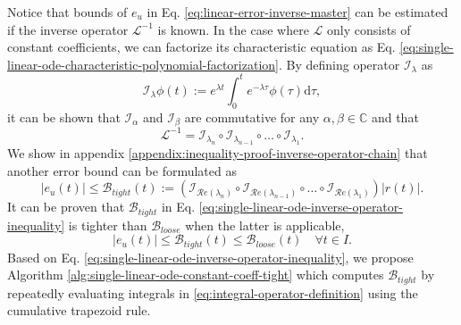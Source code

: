 \documentclass{article}
\newcommand{\Err}{e}
\newcommand{\Bound}{\mathcal{B}}
\renewcommand{\L}{\mathcal{L}}
\newcommand{\I}{\mathcal{I}}
\renewcommand{\Re}[1]{\mathcal{R}e\left(#1\right)}
\begin{document}
    Notice that bounds of $\Err_u$ in Eq. \ref{eq:linear-error-inverse-master} can be estimated if the inverse operator $\L^{-1}$ is known. 
    In the case where $\L$ only consists of constant coefficients, we can factorize its characteristic equation as Eq. \ref{eq:single-linear-ode-characteristic-polynomial-factorization}.
    By defining operator $\I_{\lambda}$ as 
    \begin{equation} \label{eq:integral-operator-definition}
        \I_\lambda \phi(t) := e^{{\lambda} t} \int_{0}^{t} e^{-{\lambda} \tau} \phi(\tau) \mathrm{d}\tau,
    \end{equation}
    it can be shown that $\I_\alpha$ and $\I_\beta$ are commutative for any $\alpha, \beta \in \mathbb{C}$ and that
    \begin{equation}
        \L^{-1} = \I_{\lambda_{n}} \circ \I_{\lambda_{n-1}} \circ \dots \circ \I_{\lambda_1}.
    \end{equation}
    We show in appendix \ref{appendix:inequality-proof-inverse-operator-chain} that another error bound can be formulated as
    \begin{equation} \label{eq:single-linear-ode-inverse-operator-inequality}
        |\Err_u(t)| \leq \Bound_{tight}(t) := \left(\I_{\Re{\lambda_{n}}} \circ \I_{\Re{\lambda_{n-1}}} \circ \dots \circ \I_{\Re{\lambda_1}}\right) |r(t)|.
    \end{equation}
    It can be proven that $\Bound_{tight}$ in Eq. \ref{eq:single-linear-ode-inverse-operator-inequality} is tighter than $\Bound_{loose}$ when the latter is applicable,
    \begin{equation}
        \left|\Err_u(t)\right| \leq \Bound_{tight}(t) \leq \Bound_{loose}(t) \quad \forall t \in I.
    \end{equation}
    Based on Eq. \ref{eq:single-linear-ode-inverse-operator-inequality}, we propose Algorithm \ref{alg:single-linear-ode-constant-coeff-tight} which computes $\Bound_{tight}$ by repeatedly evaluating integrals in \ref{eq:integral-operator-definition} using the cumulative trapezoid rule.
\end{document}
